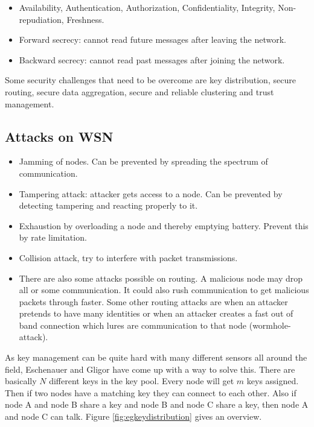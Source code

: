 \documentclass{article}
\begin{document}
\begin{itemize}
\item Availability, Authentication, Authorization, Confidentiality, Integrity, Non-repudiation, Freshness.
\item Forward secrecy: cannot read future messages after leaving the network.
\item Backward secrecy: cannot read past messages after joining the network.
\end{itemize}

Some security challenges that need to be overcome are key distribution, secure routing, secure data aggregation, secure and reliable clustering and trust management. 

\subsection*{Attacks on WSN~\cite{wang2006survey}}

\begin{itemize}
\item Jamming of nodes. Can be prevented by spreading the spectrum of communication.
\item Tampering attack: attacker gets access to a node. Can be prevented by detecting tampering and reacting properly to it.
\item Exhaustion by overloading a node and thereby emptying battery. Prevent this by rate limitation.
\item Collision attack, try to interfere with packet transmissions.
\item There are also some attacks possible on routing. A malicious node may drop all or some communication. It could also rush communication to get malicious packets through faster. Some other routing attacks are when an attacker pretends to have many identities or when an attacker creates a fast out of band connection which lures are communication to that node (wormhole-attack).
\end{itemize}

As key management can be quite hard with many different sensors all around the field, Eschenauer and Gligor have come up with a way to solve this. There are basically $N$ different keys in the key pool. Every node will get $m$ keys assigned. Then if two nodes have a matching key they can connect to each other. Also if node A and node B share a key and node B and node C share a key, then node A and node C can talk. Figure \ref{fig:egkeydistribution} gives an overview. 
\end{document}
